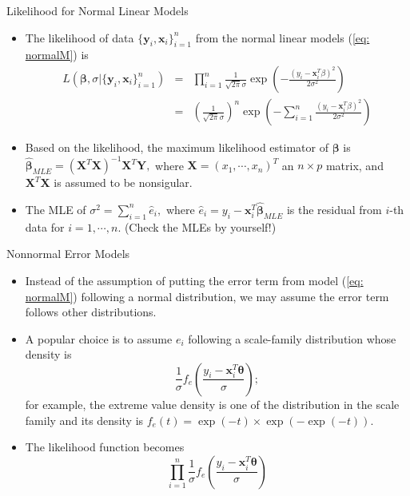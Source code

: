 \documentclass{beamer}
\begin{document}
    \begin{frame}{Likelihood for Normal Linear Models}
        \begin{itemize}
            \item The likelihood of data $\{\mathbf{y}_{i}, \mathbf{x}_{i}\}^{n}_{i=1}$ from the normal linear models (\ref{eq: normalM}) is
            \begin{eqnarray}
                L(\boldsymbol{\beta}, \sigma |\{\mathbf{y}_{i}, \mathbf{x}_{i}\}^{n}_{i=1}) & = & \prod^{n}_{i=1}\frac{1}{\sqrt{2\pi}\sigma}\exp\left(-\frac{(y_{i}-\mathbf{x}^{T}_{i}\beta)^2}{2\sigma^2}\right) \nonumber \\
                & = & \left(\frac{1}{\sqrt{2\pi}\sigma}\right)^{n}\exp\left(-\sum^{n}_{i=1}\frac{(y_{i}-\mathbf{x}^{T}_{i}\beta)^2}{2\sigma^2}\right) \nonumber
            \end{eqnarray}
            \item Based on the likelihood, the maximum likelihood estimator of $\boldsymbol{\beta}$ is $\hat{\boldsymbol{\beta}}_{MLE} = (\mathbf{X}^{T}\mathbf{X})^{-1}\mathbf{X}^{T}\mathbf{Y},$
            where $\mathbf{X} = (x_{1}, \cdots, x_{n})^{T}$ an $n \times p$ matrix, and $\mathbf{X}^{T}\mathbf{X}$ is assumed to be nonsigular.
            \item The MLE of $\sigma^2 = \sum^{n}_{i=1} \hat{e}_{i},$
            where $\hat{e}_{i} = y_{i} - \mathbf{x}^{T}_{i}\hat{\boldsymbol{\beta}}_{MLE}$ is the residual from $i$-th data for $i = 1, \cdots, n$. (Check the MLEs by yourself!)
        \end{itemize}
    \end{frame}


    \begin{frame}{Nonnormal Error Models}
        \begin{itemize}
            \item Instead of the assumption of putting the error term from model (\ref{eq: normalM}) following a  normal distribution, we may assume the error term follows other distributions.
            \item A popular choice is to assume $e_{i}$ following a scale-family distribution whose density is \begin{equation}
            \frac{1}{\sigma}f_{e}\left(\frac{y_{i} - \mathbf{x}^{T}_{i}\boldsymbol{\theta}}{\sigma}\right);
            \end{equation}
            for example, the extreme value density is one of the distribution in the scale family and its density is $f_{e}(t) = \exp(-t) \times \exp(-\exp(-t)).$
        \item The likelihood function becomes
        $$\prod^{n}_{i=1}\frac{1}{\sigma}f_{e}\left(\frac{y_{i} - \mathbf{x}^{T}_{i}\boldsymbol{\theta}}{\sigma}\right)$$
        \end{itemize}
    \end{frame}
    
\end{document}
